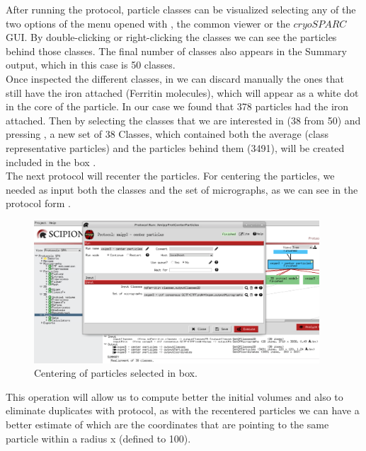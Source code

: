 After running the protocol, particle classes can be visualized selecting any of the two options of the menu opened with , the common \scipion viewer or the $cryoSPARC$ GUI. By double-clicking or right-clicking the classes we can see the particles behind those classes. The final number of classes also appears in the Summary output, which in this case is 50 classes. \\

Once inspected the different classes, in \scipion we can discard manually the ones that still have the iron attached (Ferritin molecules), which will appear as a white dot in the core of the particle. In our case we found that 378 particles had the iron attached. Then by selecting the classes that we are interested in (38 from 50) and pressing , a new set of 38 Classes, which contained both the average (class representative particles) and the particles behind them (3491), will be created included in the box .\\  

The next protocol  will recenter the particles. For centering the particles, we needed as input both the classes and the set of micrographs, as we can see in the protocol form .  

\begin{figure}[H]
  \centering
  \captionsetup{width=.8\linewidth} 
  \includegraphics[width=0.95\textwidth]
  {images/7c_xmipp3_centerparticles.pdf}
  \caption{Centering of particles selected in  box.}
  \label{fig:xmipp3_centParticles}
  \end{figure}

This operation will allow us to compute better the initial volumes and also to eliminate duplicates with  protocol, as with the recentered particles we can have a better estimate of which are the coordinates that are pointing to the same particle within a radius x (defined to 100).

